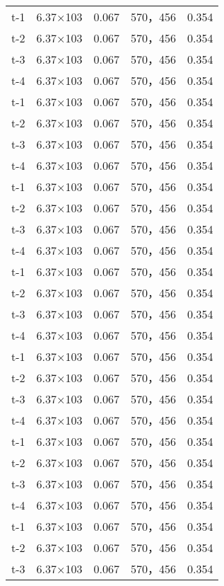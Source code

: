 \begin{longtable}{ccccc}
t-1     &6.37×103       &0.067  &570，456        &0.354\\
t-2     &6.37×103       &0.067  &570，456        &0.354\\
t-3     &6.37×103       &0.067  &570，456        &0.354\\
t-4     &6.37×103       &0.067  &570，456        &0.354\\
t-1     &6.37×103       &0.067  &570，456        &0.354\\
t-2     &6.37×103       &0.067  &570，456        &0.354\\
t-3     &6.37×103       &0.067  &570，456        &0.354\\
t-4     &6.37×103       &0.067  &570，456        &0.354\\
t-1     &6.37×103       &0.067  &570，456        &0.354\\
t-2     &6.37×103       &0.067  &570，456        &0.354\\
t-3     &6.37×103       &0.067  &570，456        &0.354\\
t-4     &6.37×103       &0.067  &570，456        &0.354\\
t-1     &6.37×103       &0.067  &570，456        &0.354\\
t-2     &6.37×103       &0.067  &570，456        &0.354\\
t-3     &6.37×103       &0.067  &570，456        &0.354\\
t-4     &6.37×103       &0.067  &570，456        &0.354\\
t-1     &6.37×103       &0.067  &570，456        &0.354\\
t-2     &6.37×103       &0.067  &570，456        &0.354\\
t-3     &6.37×103       &0.067  &570，456        &0.354\\
t-4     &6.37×103       &0.067  &570，456        &0.354\\
t-1     &6.37×103       &0.067  &570，456        &0.354\\
t-2     &6.37×103       &0.067  &570，456        &0.354\\
t-3     &6.37×103       &0.067  &570，456        &0.354\\
t-4     &6.37×103       &0.067  &570，456        &0.354\\
t-1     &6.37×103       &0.067  &570，456        &0.354\\
t-2     &6.37×103       &0.067  &570，456        &0.354\\
t-3     &6.37×103       &0.067  &570，456        &0.354\\

\end{longtable}
